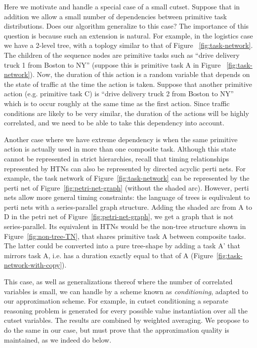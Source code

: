 \documentclass{article}
\begin{document}
Here we motivate and handle a special case of a small cutset. 
Suppose that in addition we allow a small number of dependencies
between primitive task distributions. Does our algorithm generalize to this case?
The importance of this question is because such an extension is natural. For example,
in the logistics case we have a 2-level tree, with a toplogy similar to that of Figure ~\ref{fig:task-network}.
The children of the sequence nodes are primitive tasks such as
``drive delivery truck 1 from Boston to NY'' (suppose this is primitive task A in  Figure ~\ref{fig:task-network}).
Now, the duration of this action is a random variable
that depends on the state of traffic at the time the action is taken. Suppose that another
primitive action (e.g. primitive task C) is ``drive delivery truck 2 from Boston to NY'' which is to occur roughly at the
same time as the first action. Since traffic conditions are likely to be very similar, the
duration of the actions will be highly correlated, and we need to be able to take
this dependency into account.

Another case where we have extreme dependency is when the same primitive action is actually
used in more than one composite task. Although this state cannot be represented in
strict hierarchies, recall that timing relationships represented by HTNs can also be
represented by directed acyclic perti nets. For example, the task network of Figure~\ref{fig:task-network}
can be represented by the perti net of Figure~\ref{fig:petri-net-graph} (without the shaded arc). However, perti nets allow more general
timing constraints: the language of trees is equlivalent to perti nets with a series-parallel
graph structure. Adding the shaded arc from A to D in the petri net of Figure~\ref{fig:petri-net-graph}, 
we get a graph that is not series-parallel. Its equivalent in HTNs would be the non-tree structure
shown in Figure~\ref{fig:non-tree-TN}, that shares primitive task A between composite tasks. 
The latter could be converted into a pure tree-shape by adding a task A' that mirrors task A,
i.e. has a duration exactly equal to that of A (Figure~\ref{fig:task-network-with-copy}).

This case, as well as generalizations thereof where the number of correlated variables is small,
we can handle by a scheme known as {\em conditioning}, adapted to our approximation scheme.
For example, in cutset conditioning a separate reasoning problem is generated
for every possible value instantiation over all the cutset variables. The results
are combined by weighted averaging. We propose to do the same in our case, but must prove
that the approximation quality is maintained, as we indeed do below.
\end{document}
